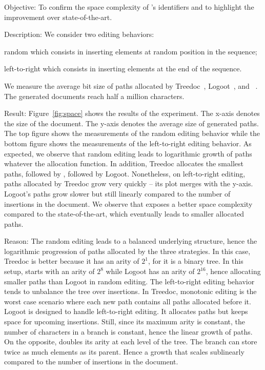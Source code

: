 \begin{asparadesc}
\item [Objective:] To confirm the space complexity of \LSEQ's identifiers and to
  highlight the improvement over state-of-the-art.
\item [Description:] We consider two editing behaviors:
  \begin{inparaenum}[(i)]
  \item random which consists in inserting elements at random position in the sequence;
  \item left-to-right which consists in inserting elements at the end of the
    sequence.
  \end{inparaenum} We measure the average bit size of paths allocated by
  Treedoc~\cite{preguica2009commutative}, Logoot~\cite{weiss2009logoot}, and
  \LSEQ~\cite{nedelec2013lseq}. The generated documents reach half a million
  characters.
\item [Result:] Figure~\ref{fig:space} shows the results of the experiment. The
  x-axis denotes the size of the document. The y-axis denotes the average size
  of generated paths. The top figure shows the measurements of the random
  editing behavior while the bottom figure shows the measurements of the
  left-to-right editing behavior. As expected, we observe that random editing
  leads to logarithmic growth of paths whatever the allocation function. In
  addition, Treedoc allocates the smallest paths, followed by \LSEQ, followed by
  Logoot. Nonetheless, on left-to-right editing, paths allocated by Treedoc grow
  very quickly -- its plot merges with the y-axis. Logoot's paths grow slower
  but still linearly compared to the number of insertions in the document. We
  observe that \LSEQ exposes a better space complexity compared to the
  state-of-the-art, which eventually leads to smaller allocated paths.
\item [Reason:] The random editing leads to a balanced underlying structure,
  hence the logarithmic progression of paths allocated by the three
  strategies. In this case, Treedoc is better because it has an arity of $2^1$,
  for it is a binary tree. In this setup, \LSEQ starts with an arity of $2^8$
  while Logoot has an arity of $2^{16}$, hence \LSEQ allocating smaller paths than
  Logoot in random editing. The left-to-right editing behavior tends to
  unbalance the tree over insertions. In Treedoc, monotonic editing is the worst
  case scenario where each new path contains all paths allocated before
  it. Logoot is designed to handle left-to-right editing. It allocates paths but
  keeps space for upcoming insertions. Still, since its maximum arity is
  constant, the number of characters in a branch is constant, hence the linear
  growth of paths. On the opposite, \LSEQ doubles its arity at each level of the
  tree. The branch can store twice as much elements as its parent. Hence a
  growth that scales sublinearly compared to the number of insertions in the
  document.
\end{asparadesc}

